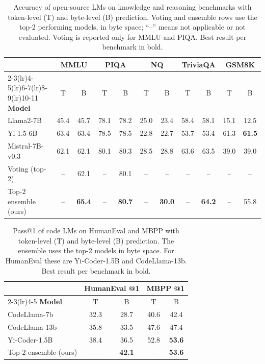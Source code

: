 \documentclass{article} %
\begin{document}
\begin{table}[t]
\caption{Accuracy of open-source LMs on knowledge and reasoning benchmarks with token-level (T) and byte-level (B) prediction. Voting and ensemble rows use the top-2 performing models, in byte space; ``--'' means not applicable or not evaluated. Voting is reported only for MMLU and PIQA. Best result per benchmark in bold.}
\label{tab:general}
\begin{center}
\footnotesize
\setlength{\tabcolsep}{3.5pt}
\begin{tabular}{lcccccccccc}
\toprule
 & \multicolumn{2}{c}{\bf MMLU} & \multicolumn{2}{c}{\bf PIQA} & \multicolumn{2}{c}{\bf NQ} & \multicolumn{2}{c}{\bf TriviaQA} & \multicolumn{2}{c}{\bf GSM8K} \\
\cmidrule(lr){2-3}\cmidrule(lr){4-5}\cmidrule(lr){6-7}\cmidrule(lr){8-9}\cmidrule(lr){10-11}
\bf Model & T & B & T & B & T & B & T & B & T & B \\
\midrule
Llama2-7B & 45.4 & 45.7 & 78.1 & 78.2 & 25.0 & 23.4 & 58.4 & 58.1 & 15.1 & 12.5 \\
Yi-1.5-6B & 63.4 & 63.4 & 78.5 & 78.5 & 22.8 & 22.7 & 53.7 & 53.4 & 61.3 & \textbf{61.5} \\
Mistral-7B-v0.3 & 62.1 & 62.1 & 80.1 & 80.3 & 28.5 & 28.8 & 63.6 & 63.5 & 39.0 & 39.0 \\
\midrule
Voting (top-2) & -- & 62.1 & -- & 80.1 & -- & -- & -- & -- & -- & -- \\
Top-2 ensemble (ours) & -- & \textbf{65.4} & -- & \textbf{80.7} & -- & \textbf{30.0} & -- & \textbf{64.2} & -- & 55.8 \\
\bottomrule
\end{tabular}
\end{center}
\end{table}

\begin{table}[t]
\caption{Pass@1 of code LMs on HumanEval and MBPP with token-level (T) and byte-level (B) prediction. The ensemble uses the top-2 models in byte space. For HumanEval these are Yi-Coder-1.5B and CodeLlama-13b. Best result per benchmark in bold.}
\label{tab:code}
\begin{center}
\begin{tabular}{lcccc}
\toprule
 & \multicolumn{2}{c}{\bf HumanEval @1} & \multicolumn{2}{c}{\bf MBPP @1} \\
\cmidrule(lr){2-3}\cmidrule(lr){4-5}
\bf Model & T & B & T & B \\
\midrule
CodeLlama-7b & 32.3 & 28.7 & 40.6 & 42.4 \\
CodeLlama-13b & 35.8 & 33.5 & 47.6 & 47.4 \\
Yi-Coder-1.5B & 38.4 & 36.5 & 52.8 & \textbf{53.6} \\
\midrule
Top-2 ensemble (ours) & -- & \textbf{42.1} & -- & \textbf{53.6} \\
\bottomrule
\end{tabular}
\end{center}
\end{table}
\end{document}
